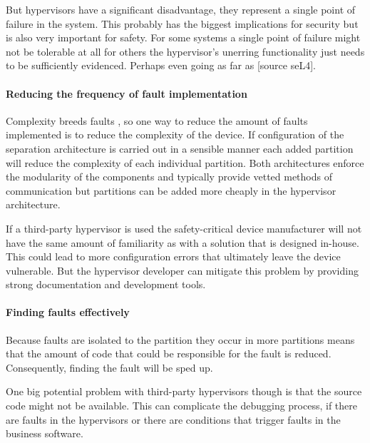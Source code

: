 But hypervisors have a significant disadvantage, they represent a single point of failure in the system. This probably has the biggest implications for security but is also very important for safety. For some systems a single point of failure might not be tolerable at all for others the hypervisor's unerring functionality just needs to be sufficiently evidenced. Perhaps even going as far as  [source seL4].


\paragraph{Reducing the frequency of fault implementation}
Complexity breeds faults \cite{nguyen2017impact}, so one way to reduce the amount of faults implemented is to reduce the complexity of the device. If configuration of the separation architecture is carried out in a sensible manner each added partition will reduce the complexity of each individual partition. Both architectures enforce the modularity of the components and typically provide vetted methods of communication but partitions can be added more cheaply in the hypervisor architecture.

If a third-party hypervisor is used the safety-critical device manufacturer will not have the same amount of familiarity as with a solution that is designed in-house. This could lead to more configuration errors that ultimately leave the device vulnerable. But the hypervisor developer can mitigate this problem by providing strong documentation and development tools.

\paragraph{Finding  faults effectively}
Because faults are isolated to the partition they occur in more partitions means that the amount of code that could be responsible for the fault is reduced. Consequently, finding the fault will be sped up.

One big potential problem with third-party hypervisors though is that the source code might not be available. This can complicate the debugging process, if there are faults in the hypervisors or there are conditions that trigger faults in the business software. 

